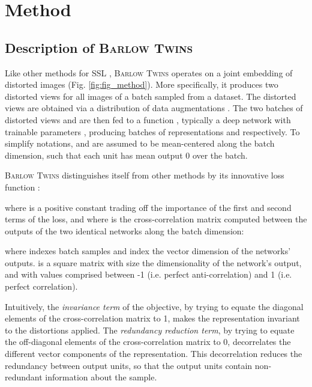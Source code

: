 \documentclass{article}
\newcommand{\AlgoName}{\textsc{Barlow Twins}}
\begin{document}
 \section{Method}


\subsection{Description of \AlgoName{}}








Like other methods for SSL \cite{caron2020swav,grill2020bootstrap,chen2020simple,he2019momentum,misra2019self}, \AlgoName{} operates on a joint embedding of distorted images (Fig. \ref{fig:fig_method}). More specifically, it produces two distorted views for all images of a batch  sampled from a dataset. The distorted views are obtained via a distribution of data augmentations . The two batches of distorted views  and  are then fed to a function , typically a deep network with trainable parameters , producing batches of representations  and  respectively. To simplify notations,  and  are assumed to be mean-centered along the batch dimension, such that each unit has mean output 0 over the batch. 

\AlgoName{} distinguishes itself from other methods by its innovative loss function :



where  is a positive constant trading off the importance of the first and second terms of the loss, and where  is the cross-correlation matrix computed between the outputs of the two identical networks along the batch dimension:



where  indexes batch samples and  index the vector dimension of the networks' outputs.  is a square matrix with size the dimensionality of the network's output, and with values comprised between -1 (i.e. perfect anti-correlation) and 1 (i.e. perfect correlation). 



Intuitively, the \emph{invariance term} of the objective, by trying to equate the diagonal elements of the cross-correlation matrix to 1, makes the representation invariant to the distortions applied.  The \emph{redundancy reduction term}, by trying to equate the off-diagonal elements of the cross-correlation matrix to 0, decorrelates the different vector components of the representation. This decorrelation reduces the redundancy between output units, so that the output units contain non-redundant information about the sample. 
\end{document}
